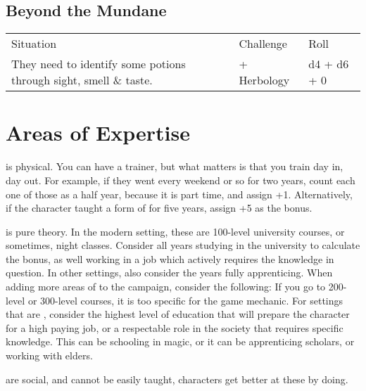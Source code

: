 \subsection*{Beyond the Mundane}

\begin{center}
	\begin{xltabular}{\textwidth}{Xll}
		Situation												& Challenge 								& Roll \\
		They need to identify some potions through sight, smell \& taste. 				&  + Herbology		& d4 + d6 + 0 \\
	\end{xltabular}
\end{center}





\section{Areas of Expertise}


 is physical.
You can have a trainer, but what matters is that you train day in, day out.
For example, if they went  every weekend or so for two years, count each one of those as a half year, because it is part time, and assign +1.
Alternatively, if the character taught a form of  for five years, assign +5 as the bonus.\par
{} is pure theory.
In the modern setting, these are 100-level university courses, or sometimes, night classes.
Consider all years studying in the university to calculate the bonus, as well working in a job which actively requires the knowledge in question.
In other settings, also consider the years fully apprenticing.
When adding more areas of  to the campaign, consider the following:
If you go to 200-level or 300-level courses, it is too specific for the game mechanic.
For settings that are , consider the highest level of
education that will prepare the character for a high paying job, or a respectable role in the society that requires specific knowledge.
This can be schooling in magic, or it can be apprenticing scholars, or working with elders.
\par
{} are social, and cannot be easily taught, characters get better at these by doing.\par

